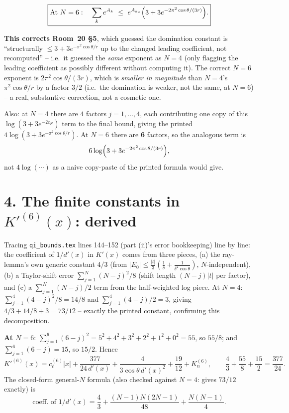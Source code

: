 \documentclass[11pt]{article}
\begin{document}
\[
  \boxed{\text{At }N=6:\quad \sum_ke^{A_k}\ \le\ e^{A_{k_*}}\Bigl(3+3e^{-2\pi^2\cos\theta/(3r)}\Bigr).}
\]

\textbf{This corrects Room~20 \S5}, which guessed the domination constant is ``structurally $\le
3+3e^{-\pi^2\cos\theta/r}$ up to the changed leading coefficient, not recomputed'' -- i.e.\ it
guessed the \emph{same} exponent as $N=4$ (only flagging the leading coefficient as possibly
different without computing it). The correct $N=6$ exponent is $2\pi^2\cos\theta/(3r)$, which is
\emph{smaller in magnitude} than $N=4$'s $\pi^2\cos\theta/r$ by a factor $3/2$ (i.e.\ the domination
is weaker, not the same, at $N=6$) -- a real, substantive correction, not a cosmetic one.

Also: at $N=4$ there are $4$ factors $j=1,\dots,4$, each contributing one copy of this
$\log(3+3e^{-2c_N})$ term to the final bound, giving the printed $4\log(3+3e^{-\pi^2\cos\theta/
r})$. At $N=6$ there are \textbf{6} factors, so the analogous term is
\[
  6\log\Bigl(3+3e^{-2\pi^2\cos\theta/(3r)}\Bigr),
\]
not $4\log(\cdots)$ as a naive copy-paste of the printed formula would give.

\section*{4. The finite constants in $K'^{(6)}(x)$: derived}

Tracing \texttt{qi\_bounds.tex} lines 144--152 (part (ii)'s error bookkeeping) line by line: the
coefficient of $1/d'(x)$ in $K'(x)$ comes from three pieces, (a) the ray-lemma's own generic
constant $4/3$ (from $|E_0|\le\frac{|t|}3(\frac1\delta+\frac1{\delta^2\cos\theta})$, $N$-independent),
(b) a Taylor-shift error $\sum_{j=1}^N(N-j)^2/8$ (shift length $(N-j)|t|$ per factor), and (c) a
$\sum_{j=1}^N(N-j)/2$ term from the half-weighted log piece. At $N=4$:
$\sum_{j=1}^4(4-j)^2/8=14/8$ and $\sum_{j=1}^4(4-j)/2=3$, giving $4/3+14/8+3=73/12$ -- exactly the
printed constant, confirming this decomposition.

\textbf{At $N=6$}: $\sum_{j=1}^6(6-j)^2=5^2+4^2+3^2+2^2+1^2+0^2=55$, so $55/8$; and
$\sum_{j=1}^6(6-j)=15$, so $15/2$. Hence
\[
  \boxed{K'^{(6)}(x)=c_\ell^{(6)}|x|+\frac{377}{24\,d'(x)}+\frac4{3\cos\theta\,d'(x)^2}+\frac{19}{12}
  +K_n^{(6)}},\qquad \frac43+\frac{55}8+\frac{15}2=\frac{377}{24}.
\]
The closed-form general-$N$ formula (also checked against $N=4$: gives $73/12$ exactly) is
\[
  \text{coeff.\ of }1/d'(x)=\frac43+\frac{(N-1)N(2N-1)}{48}+\frac{N(N-1)}4.
\]
\end{document}
